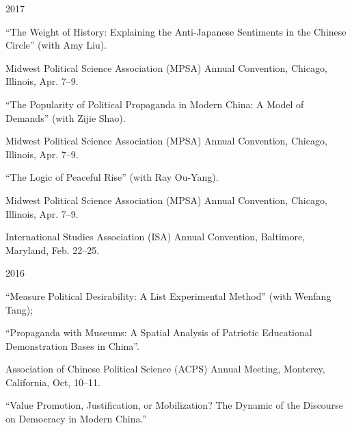 \documentclass[10.5pt,]{article}
\providecommand{\tightlist}{%
	\setlength{\itemsep}{0pt}\setlength{\parskip}{0pt}}
\renewenvironment{itemize}{
	\begin{list}{}{
			\setlength{\leftmargin}{1.5em}
		}
	}{
	\end{list}
}
\begin{document}
\begin{itemize}
\tightlist
\item
  2017

  \begin{itemize}
  \tightlist
  \item
    ``The Weight of History: Explaining the Anti-Japanese Sentiments in
    the Chinese Circle'' (with Amy Liu).

    \begin{itemize}
    \tightlist
    \item
      \footnotesize Midwest Political Science Association (MPSA) Annual
      Convention, Chicago, Illinois, Apr. 7--9.
    \end{itemize}
  \item
    ``The Popularity of Political Propaganda in Modern China: A Model of
    Demands'' (with Zijie Shao).

    \begin{itemize}
    \tightlist
    \item
      \footnotesize Midwest Political Science Association (MPSA) Annual
      Convention, Chicago, Illinois, Apr. 7--9.
    \end{itemize}
  \item
    ``The Logic of Peaceful Rise'' (with Ray Ou-Yang).

    \begin{itemize}
    \tightlist
    \item
      \footnotesize Midwest Political Science Association (MPSA) Annual
      Convention, Chicago, Illinois, Apr. 7--9.
    \item
      \footnotesize International Studies Association (ISA) Annual
      Convention, Baltimore, Maryland, Feb. 22--25.
    \end{itemize}
  \end{itemize}
\item
  2016

  \begin{itemize}
  \tightlist
  \item
    ``Measure Political Desirability: A List Experimental Method'' (with
    Wenfang Tang);
  \item
    ``Propaganda with Museums: A Spatial Analysis of Patriotic
    Educational Demonstration Bases in China''.

    \begin{itemize}
    \tightlist
    \item
      \footnotesize Association of Chinese Political Science (ACPS)
      Annual Meeting, Monterey, California, Oct, 10--11.
    \end{itemize}
  \item
    ``Value Promotion, Justification, or Mobilization? The Dynamic of
    the Discourse on Democracy in Modern China.''


\end{itemize}
\end{itemize}
\end{document}
